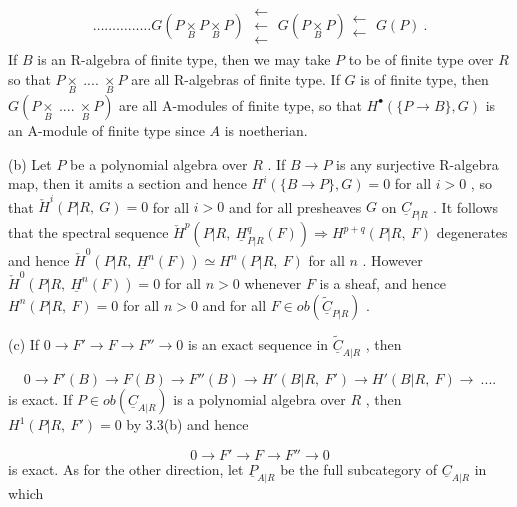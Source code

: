 \begin{multline*}
\dots\dots\dots\dots\dots G(P \underset{B}{\times} P \underset{B}{\times} P) \;\substack{\longleftarrow\\ \longleftarrow\\ \longleftarrow}\; G(P \underset{B}{\times} P) \substack{\longleftarrow\\ \longleftarrow}\; G(P) \ .
\end{multline*}
If  $B$  is an R-algebra of finite type, then we may take  $P$  to be of finite type over  $R$  so that  $P\underset{B}{\times}\ ....\ \underset{B}{\times}P$  are all R-algebras of finite type. If  $G$  is of finite type, then  $G(P\underset{B}{\times}\ ....\ \underset{B}{\times}P)$  are all A-modules of finite type, so that  $H^{\bullet}(\{P \to B\},G)$  is an A-module of finite type since  $A$  is noetherian.

(b)  Let  $P$  be a polynomial algebra over  $R$ . If  $B \to P$  is any surjective R-algebra map, then it amits a section and hence  $H^{i}(\{B \to P\},G) = 0$  for all  $i > 0$ , so that  $\check{H}^{i}(P|R,\ G) = 0$  for all  $i > 0$  and for all presheaves  $G$  on  $\underline{C}_{P|R}$ . It follows that the spectral sequence  $\check{H}^{p}(P|R,\ \underline{H}^{q}_{P|R}(F)) \Rightarrow H^{p+q}(P|R,\ F)$  degenerates and hence  $\check{H}^{0}(P|R,\ \underline{H}^{n}(F)) \simeq H^{n}(P|R,\ F)$  for all  $n$ . However  $\check{H}^{0}(P|R,\ \underline{H}^{n}(F)) = 0$  for all  $n > 0$  whenever  $F$  is a sheaf, and hence  $H^{n}(P|R,\ F) = 0$  for all  $n > 0$  and for all  $F \in ob(\widetilde{\underline{C}}_{P|R})$ .

(c)  If  $0 \to F' \to F \to F'' \to 0$  is an exact sequence in  $\widetilde{\underline{C}}_{A|R}$ , then

\begin{equation*}
0 \to F'(B) \to F(B) \to F''(B) \to H'(B|R,\ F') \to H'(B|R,\ F) \to \ ....
\end{equation*}
is exact. If  $P \in ob(\underline{C}_{A|R})$  is a polynomial algebra over  $R$ , then  $H^{1}(P|R,\ F') = 0$  by 3.3(b) and hence

\begin{equation*}
0 \to F' \to F \to F'' \to 0
\end{equation*}
is exact. As for the other direction, let  $\underline{P}_{A|R}$  be the full subcategory of  $\underline{C}_{A|R}$  in which

